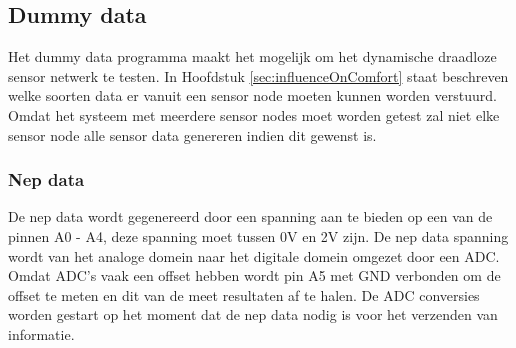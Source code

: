 \subsection{Dummy data} \label{sec:dummyData}
Het dummy data programma maakt het mogelijk om het dynamische draadloze sensor netwerk te testen. In Hoofdstuk \ref{sec:influenceOnComfort} staat beschreven welke soorten data er vanuit een sensor node moeten kunnen worden verstuurd. Omdat het systeem met meerdere sensor nodes moet worden getest zal niet elke sensor node alle sensor data genereren indien dit gewenst is. 

\subsubsection{Nep data}
De nep data wordt gegenereerd door een spanning aan te bieden op een van de pinnen A0 - A4, deze spanning moet tussen 0V en 2V zijn. De nep data spanning wordt van het analoge domein naar het digitale domein omgezet door een ADC. Omdat ADC's vaak een offset hebben wordt pin A5 met GND verbonden om de offset te meten en dit van de meet resultaten af te halen. De ADC conversies worden gestart op het moment dat de nep data nodig is voor het verzenden van informatie.

